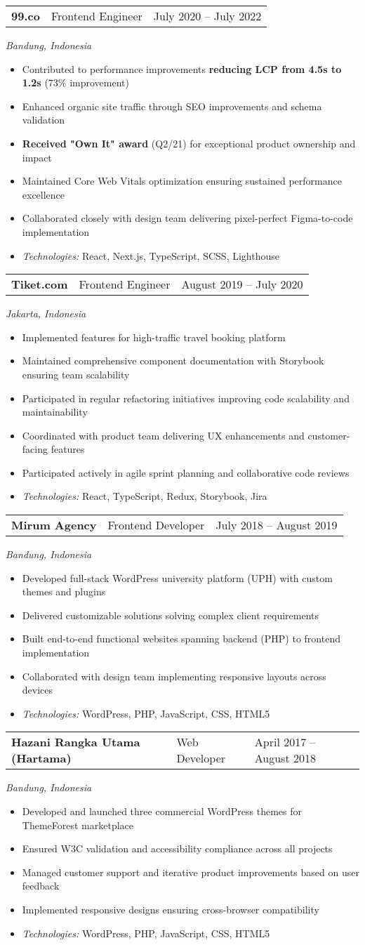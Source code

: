 \documentclass[a4paper, 11pt]{article}
\newcommand{\resumeItem}[1]{
  \item\small{
    {#1 \vspace{-2pt}}
  }
}
\newcommand{\resumeSubheading}[4]{
  \vspace{-2pt}\item
    \begin{tabularx}{0.987\textwidth}[t]{
  >{\raggedright\arraybackslash}X
  >{\centering\arraybackslash}X
  >{\raggedleft\arraybackslash}X }
      \textbf{#1} & #2 & #3 \\
    \end{tabularx}
    \textit{\small#4}\\
    \vspace{-7pt}
}
\newcommand{\resumeItemListStart}{\begin{itemize}[leftmargin=0.22in]}
\newcommand{\resumeItemListEnd}{\end{itemize}\vspace{-20pt}}
\begin{document}
      \resumeSubheading
        {99.co}{Frontend Engineer}{July 2020 -- July 2022}
        {Bandung, Indonesia}
        \resumeItemListStart
          \resumeItem{Contributed to performance improvements \textbf{reducing LCP from 4.5s to 1.2s} (73\% improvement)}
          \resumeItem{Enhanced organic site traffic through SEO improvements and schema validation}
          \resumeItem{\textbf{Received "Own It" award} (Q2/21) for exceptional product ownership and impact}
          \resumeItem{Maintained Core Web Vitals optimization ensuring sustained performance excellence}
          \resumeItem{Collaborated closely with design team delivering pixel-perfect Figma-to-code implementation}
          \resumeItem{\textit{Technologies:} React, Next.js, TypeScript, SCSS, Lighthouse}
        \resumeItemListEnd

      \resumeSubheading
        {Tiket.com}{Frontend Engineer}{August 2019 -- July 2020}
        {Jakarta, Indonesia}
        \resumeItemListStart
          \resumeItem{Implemented features for high-traffic travel booking platform}
          \resumeItem{Maintained comprehensive component documentation with Storybook ensuring team scalability}
          \resumeItem{Participated in regular refactoring initiatives improving code scalability and maintainability}
          \resumeItem{Coordinated with product team delivering UX enhancements and customer-facing features}
          \resumeItem{Participated actively in agile sprint planning and collaborative code reviews}
          \resumeItem{\textit{Technologies:} React, TypeScript, Redux, Storybook, Jira}
        \resumeItemListEnd

      \resumeSubheading
        {Mirum Agency}{Frontend Developer}{July 2018 -- August 2019}
        {Bandung, Indonesia}
        \resumeItemListStart
          \resumeItem{Developed full-stack WordPress university platform (UPH) with custom themes and plugins}
          \resumeItem{Delivered customizable solutions solving complex client requirements}
          \resumeItem{Built end-to-end functional websites spanning backend (PHP) to frontend implementation}
          \resumeItem{Collaborated with design team implementing responsive layouts across devices}
          \resumeItem{\textit{Technologies:} WordPress, PHP, JavaScript, CSS, HTML5}
        \resumeItemListEnd

      \resumeSubheading
        {Hazani Rangka Utama (Hartama)}{Web Developer}{April 2017 -- August 2018}
        {Bandung, Indonesia}
        \resumeItemListStart
          \resumeItem{Developed and launched three commercial WordPress themes for ThemeForest marketplace}
          \resumeItem{Ensured W3C validation and accessibility compliance across all projects}
          \resumeItem{Managed customer support and iterative product improvements based on user feedback}
          \resumeItem{Implemented responsive designs ensuring cross-browser compatibility}
          \resumeItem{\textit{Technologies:} WordPress, PHP, JavaScript, CSS, HTML5}
        \resumeItemListEnd
\end{document}
